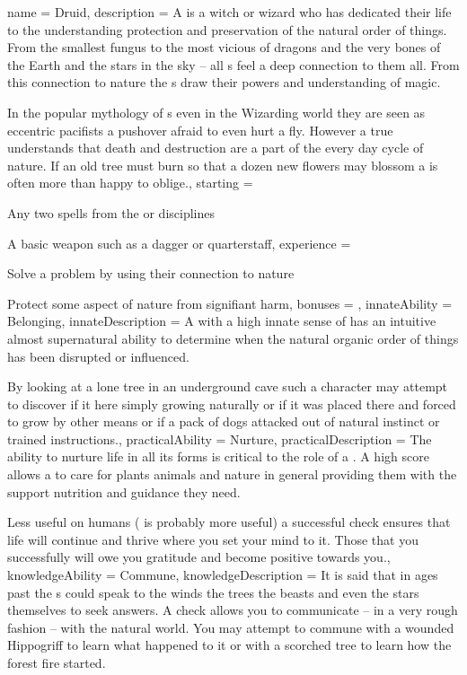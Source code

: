\archetype
{
	name = Druid,
	description = A {\bname{}} is a witch or wizard who has dedicated their life to the understanding\comma{} protection and preservation of the natural order of things. From the smallest fungus\comma{} to the most vicious of dragons\comma{} and the very bones of the Earth\comma{} and the stars in the sky – all {\bname{}}s feel a deep connection to them all. From this connection to nature\comma{} the \bname{}s draw their powers and understanding of magic.

In the popular mythology of \bname{}s\comma{} even in the Wizarding world\comma{} they are seen as eccentric pacifists\comma{} a pushover afraid to even hurt a fly. However\comma{} a true \bname{} understands that death and destruction are a part of the every day cycle of nature. If an old tree must burn so that a dozen new flowers may blossom\comma{} a  is often more than happy to oblige.,
	starting = 
\item Any two spells from the  or  disciplines
\item A basic weapon such as a dagger or quarterstaff,
	experience = \item Solve a problem by using their connection to nature
\item Protect some aspect of nature from signifiant harm,
	bonuses = 
,
	innateAbility = Belonging,
	innateDescription = A \bname{} with a high innate sense of  has an intuitive\comma{} almost supernatural ability to determine when the natural\comma{} organic\comma{} order of things has been disrupted or influenced.

By looking at a lone tree in an underground cave\comma{} such a character may attempt to discover if it  here\comma{} simply growing naturally\comma{} or if it was placed there and forced to grow by other means\comma{} or if a pack of dogs attacked out of natural instinct\comma{} or trained instructions.,
	practicalAbility = Nurture,
	practicalDescription = The ability to nurture life\comma{} in all its forms\comma{} is critical to the role of a \bname{}. A high  score allows a \bname{} to care for plants\comma{} animals and nature in general\comma{} providing them with the support\comma{} nutrition and guidance they need.

Less useful on humans ( is probably more useful)\comma{} a successful  check ensures that life will continue and thrive where you set your mind to it. Those that you successfully  will owe you gratitude and become positive towards you.,
	knowledgeAbility = Commune,
	knowledgeDescription = It is said that\comma{} in ages past\comma{} the \bname{}s could speak to the winds\comma{} the trees\comma{} the beasts and even the stars themselves to seek answers. A  check allows you to communicate – in a very rough fashion – with the natural world. You may attempt to commune with a wounded Hippogriff to learn what happened to it\comma{} or with a scorched tree to learn how the forest fire started. 

}
